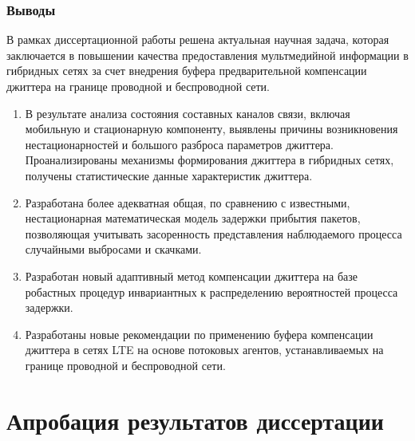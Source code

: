 \documentclass[10pt,pdf,hyperref={unicode}]{beamer}
\begin{document}
\begin{frame}
\frametitle{Выводы}



{\small

В рамках диссертационной работы решена актуальная научная задача, которая заключается в повышении качества предоставления мультмедийной информации в гибридных сетях за счет внедрения буфера предварительной компенсации джиттера на границе проводной и беспроводной сети.
}

\begin{footnotesize}
\begin{enumerate}
  \item В результате анализа состояния составных каналов связи, включая мобильную и стационарную компоненту, выявлены причины возникновения нестационарностей и большого разброса параметров джиттера.
  Проанализированы механизмы формирования джиттера в гибридных сетях, получены статистические данные характеристик джиттера.
  \item Разработана более адекватная общая, по сравнению с известными, нестационарная математическая модель задержки прибытия пакетов,
  позволяющая учитывать засоренность представления наблюдаемого процесса случайными выбросами и скачками.
  \item 
  Разработан новый адаптивный метод компенсации джиттера на базе робастных процедур инвариантных к распределению вероятностей процесса задержки.
  \item 
  Разработаны новые рекомендации по применению буфера компенсации джиттера в сетях LTE на основе потоковых агентов, устанавливаемых на границе проводной и беспроводной сети.
\end{enumerate}
\end{footnotesize}


\end{frame}


\section{Апробация результатов диссертации}
\end{document}
